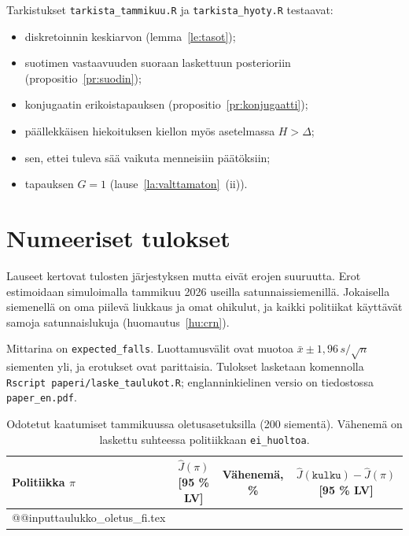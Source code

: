 \documentclass[11pt,a4paper]{article}
\makeatletter
\theoremstyle{plain}
\theoremstyle{definition}
\theoremstyle{remark}
\newcommand{\1}{\mathbf{1}}
\newcommand{\pol}[1]{\texttt{#1}}
\newcommand{\rivit}[1]{\csname @@input\endcsname #1 }
\makeatother
\begin{document}
Tarkistukset \texttt{tarkista\_tammikuu.R} ja \texttt{tarkista\_hyoty.R}
testaavat:
\begin{itemize}
  \item diskretoinnin keskiarvon (lemma~\ref{le:tasot});
  \item suotimen vastaavuuden suoraan laskettuun posterioriin (propositio~\ref{pr:suodin});
  \item konjugaatin erikoistapauksen (propositio~\ref{pr:konjugaatti});
  \item päällekkäisen hiekoituksen kiellon myös asetelmassa $H > \Delta$;
  \item sen, ettei tuleva sää vaikuta menneisiin päätöksiin;
  \item tapauksen $G = 1$ (lause~\ref{la:valttamaton}~(ii)).
\end{itemize}

\section{Numeeriset tulokset}\label{sec:numeeriset}

Lauseet kertovat tulosten järjestyksen mutta eivät erojen suuruutta. Erot
estimoidaan simuloimalla tammikuu 2026 useilla satunnaissiemenillä. Jokaisella
siemenellä on oma piilevä liukkaus ja omat ohikulut, ja kaikki politiikat
käyttävät samoja satunnaislukuja (huomautus~\ref{hu:crn}).

Mittarina on \texttt{expected\_falls}. Luottamusvälit ovat muotoa
$\bar x \pm 1{,}96\, s/\sqrt{n}$ siementen yli, ja erotukset ovat parittaisia.
Tulokset lasketaan komennolla \texttt{Rscript paperi/laske\_taulukot.R}; englanninkielinen versio on tiedostossa \texttt{paper\_en.pdf}.

\begin{table}[ht]
\centering
\small
\setlength{\tabcolsep}{5pt}
\begin{tabular}{@{}lccc@{}}
\toprule
Politiikka $\pi$ & $\hat J(\pi)$ [95 \% LV] & Vähenemä, \% & $\hat J(\pol{kulku}) - \hat J(\pi)$ [95 \% LV] \\
\midrule
\rivit{taulukko_oletus_fi.tex}
\bottomrule
\end{tabular}
\caption{Odotetut kaatumiset tammikuussa oletusasetuksilla (200 siementä).
Vähenemä on laskettu suhteessa politiikkaan \pol{ei\_huoltoa}.}
\label{tab:oletus}
\end{table}
\end{document}
